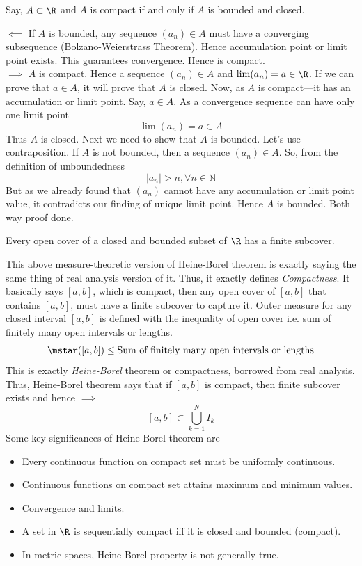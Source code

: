 \begin{theorem}
    Say, $A \subset \R$ and $A$ is compact if and only if $A$ is bounded and closed.
\end{theorem}
\begin{proofsketch}
    $\impliedby$ If $A$ is bounded, any sequence $(a_n)\in A$ must have a converging subsequence (Bolzano-Weierstrass Theorem). Hence accumulation point or limit point exists. This guarantees convergence. Hence is compact.\\
    $\implies$ $A$ is compact. Hence a sequence $(a_n)\in A$ and $\lim (a_n)=a\in \R$. If we can prove that $a \in A$, it will prove that $A$ is closed. Now, as $A$ is compact---it has an accumulation or limit point. Say, $a \in A$. As a convergence sequence can have only one limit point
    \[
    \lim (a_n)=a\in A
    \]
    Thus $A$ is closed. Next we need to show that $A$ is bounded. Let's use contraposition. If $A$ is not bounded, then a sequence $(a_n)\in A$. So, from the definition of unboundedness
    \[
    |a_n| > n,  \forall n\in \mathbb{N}
    \]
    But as we already found that $(a_n)$ cannot have any accumulation or limit point value, it contradicts our finding of unique limit point. Hence $A$ is bounded. Both way proof done. 
\end{proofsketch}
\begin{theorem}
Every open cover of a closed and bounded subset of $\R$ has a finite subcover. 
\end{theorem}
\begin{remark}
    This above measure-theoretic version of Heine-Borel theorem is exactly saying the same thing of real analysis version of it. Thus, it exactly defines \textit{Compactness}. It basically says $[a, b]$, which is compact, then any open cover of $[a, b]$ that contains $[a, b]$, must have a finite subcover to capture it. Outer measure for any closed interval $[a, b]$ is defined with the inequality of open cover i.e. sum of finitely many open intervals or lengths. 
    \[
    \mstar([a, b]) \leq \text{Sum of finitely many open intervals or lengths}
    \]
    This is exactly \textit{Heine-Borel} theorem or compactness, borrowed from real analysis. Thus, Heine-Borel theorem says that if $[a, b]$ is compact, then finite subcover exists and hence $\implies$
    \[
    [a, b] \subset \bigcup_{k=1}^N I_k
    \]
    Some key significances of Heine-Borel theorem are
    \begin{itemize}
        \item Every continuous function on compact set must be uniformly continuous.
        \item Continuous functions on compact set attains maximum and minimum values.
        \item Convergence and limits.
        \item A set in $\R$ is sequentially compact iff it is closed and bounded (compact).
        \item In metric spaces, Heine-Borel property is not generally true.
        
    \end{itemize}
    \end{remark}

